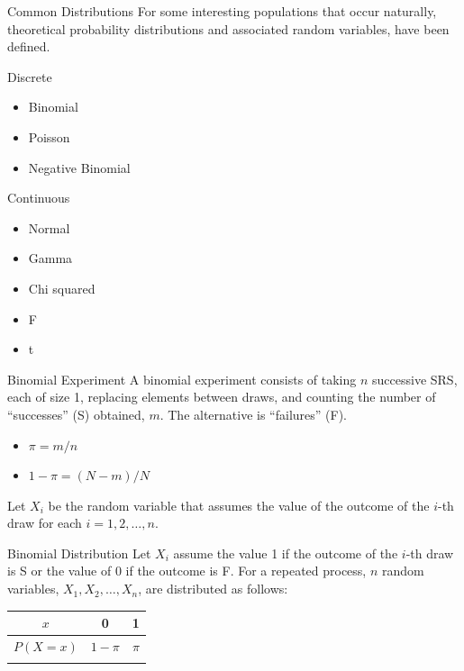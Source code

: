 \documentclass[
  ignorenonframetext,
]{beamer}
\newcounter{none} %
\providecommand{\tightlist}{%
  \setlength{\itemsep}{0pt}\setlength{\parskip}{0pt}}
\begin{document}
\begin{frame}{Common Distributions}
\protect{}\label{common-distributions}
For some interesting populations that occur naturally, theoretical
probability distributions and associated random variables, have been
defined.

Discrete

\begin{itemize}
\tightlist
\item
  Binomial
\item
  Poisson
\item
  Negative Binomial
\end{itemize}

Continuous

\begin{itemize}
\tightlist
\item
  Normal
\item
  Gamma
\item
  Chi squared
\item
  F
\item
  t
\end{itemize}
\end{frame}

\begin{frame}{Binomial Experiment}
\protect{}\label{binomial-experiment}
A binomial experiment consists of taking \(n\) successive SRS, each of
size 1, replacing elements between draws, and counting the number of
``successes'' (S) obtained, \(m\). The alternative is ``failures'' (F).

\begin{itemize}
\tightlist
\item
  \(\pi=m/n\)
\item
  \(1-\pi=(N-m)/N\)
\end{itemize}

Let \(X_i\) be the random variable that assumes the value of the outcome
of the \(i\)-th draw for each \(i=1,2,\dots,n\).
\end{frame}

\begin{frame}{Binomial Distribution}
\protect{}\label{binomial-distribution}
Let \(X_i\) assume the value 1 if the outcome of the \(i\)-th draw is S
or the value of 0 if the outcome is F. For a repeated process, \(n\)
random variables, \(X_1,X_2,\dots,X_n\), are distributed as follows:

{\def\LTcaptype{none} %
\begin{longtable}[]{@{}ccc@{}}
\toprule\noalign{}
\(x\) & 0 & 1 \\
\midrule\noalign{}
\endhead
\(P(X=x)\) & \(1-\pi\) & \(\pi\) \\
\bottomrule\noalign{}
\end{longtable}
}
\end{frame}
\end{document}
